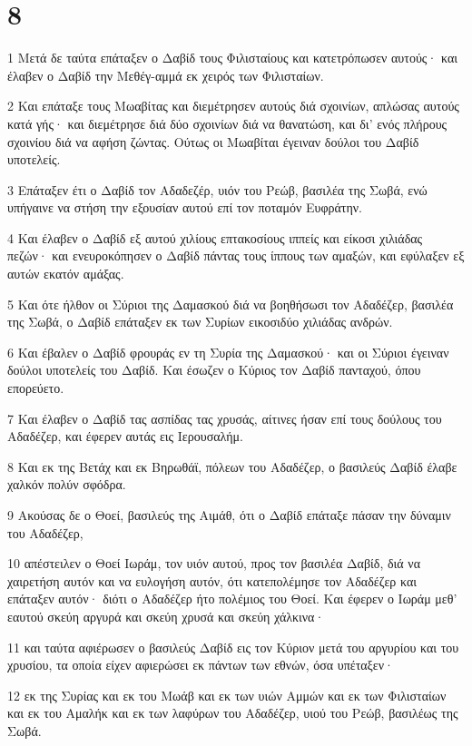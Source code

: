 \chapter{8}

\par 1 Μετά δε ταύτα επάταξεν ο Δαβίδ τους Φιλισταίους και κατετρόπωσεν αυτούς· και έλαβεν ο Δαβίδ την Μεθέγ-αμμά εκ χειρός των Φιλισταίων.
\par 2 Και επάταξε τους Μωαβίτας και διεμέτρησεν αυτούς διά σχοινίων, απλώσας αυτούς κατά γής· και διεμέτρησε διά δύο σχοινίων διά να θανατώση, και δι' ενός πλήρους σχοινίου διά να αφήση ζώντας. Ούτως οι Μωαβίται έγειναν δούλοι του Δαβίδ υποτελείς.
\par 3 Επάταξεν έτι ο Δαβίδ τον Αδαδεζέρ, υιόν του Ρεώβ, βασιλέα της Σωβά, ενώ υπήγαινε να στήση την εξουσίαν αυτού επί τον ποταμόν Ευφράτην.
\par 4 Και έλαβεν ο Δαβίδ εξ αυτού χιλίους επτακοσίους ιππείς και είκοσι χιλιάδας πεζών· και ενευροκόπησεν ο Δαβίδ πάντας τους ίππους των αμαξών, και εφύλαξεν εξ αυτών εκατόν αμάξας.
\par 5 Και ότε ήλθον οι Σύριοι της Δαμασκού διά να βοηθήσωσι τον Αδαδέζερ, βασιλέα της Σωβά, ο Δαβίδ επάταξεν εκ των Συρίων εικοσιδύο χιλιάδας ανδρών.
\par 6 Και έβαλεν ο Δαβίδ φρουράς εν τη Συρία της Δαμασκού· και οι Σύριοι έγειναν δούλοι υποτελείς του Δαβίδ. Και έσωζεν ο Κύριος τον Δαβίδ πανταχού, όπου επορεύετο.
\par 7 Και έλαβεν ο Δαβίδ τας ασπίδας τας χρυσάς, αίτινες ήσαν επί τους δούλους του Αδαδέζερ, και έφερεν αυτάς εις Ιερουσαλήμ.
\par 8 Και εκ της Βετάχ και εκ Βηρωθάϊ, πόλεων του Αδαδέζερ, ο βασιλεύς Δαβίδ έλαβε χαλκόν πολύν σφόδρα.
\par 9 Ακούσας δε ο Θοεί, βασιλεύς της Αιμάθ, ότι ο Δαβίδ επάταξε πάσαν την δύναμιν του Αδαδέζερ,
\par 10 απέστειλεν ο Θοεί Ιωράμ, τον υιόν αυτού, προς τον βασιλέα Δαβίδ, διά να χαιρετήση αυτόν και να ευλογήση αυτόν, ότι κατεπολέμησε τον Αδαδέζερ και επάταξεν αυτόν· διότι ο Αδαδέζερ ήτο πολέμιος του Θοεί. Και έφερεν ο Ιωράμ μεθ' εαυτού σκεύη αργυρά και σκεύη χρυσά και σκεύη χάλκινα·
\par 11 και ταύτα αφιέρωσεν ο βασιλεύς Δαβίδ εις τον Κύριον μετά του αργυρίου και του χρυσίου, τα οποία είχεν αφιερώσει εκ πάντων των εθνών, όσα υπέταξεν·
\par 12 εκ της Συρίας και εκ του Μωάβ και εκ των υιών Αμμών και εκ των Φιλισταίων και εκ του Αμαλήκ και εκ των λαφύρων του Αδαδέζερ, υιού του Ρεώβ, βασιλέως της Σωβά.
